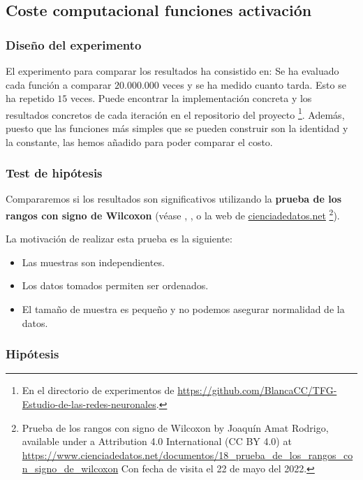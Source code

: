 \subsection{Coste computacional funciones activación }
\label{ch06:coste-computacional-funciones-activacion}

\subsubsection{Diseño del experimento}
El experimento para comparar los resultados ha consistido en: 
Se ha evaluado cada función a comparar $20.000.000$ veces y se ha medido cuanto tarda. 
Esto se ha repetido $15$ veces. Puede encontrar la implementación concreta y los resultados concretos de cada iteración en el repositorio del
proyecto \footnote{En el directorio de experimentos 
de \url{https://github.com/BlancaCC/TFG-Estudio-de-las-redes-neuronales}.}.
Además, puesto que las funciones más simples que se pueden construir son la identidad y la constante, las hemos añadido para poder comparar el costo. 

\subsubsection{Test de hipótesis}

Compararemos si los resultados son significativos utilizando la \textbf{prueba de los rangos con 
signo de Wilcoxon} (véase \cite{OpenIntroStatistics}, \cite{BiologicalStatistics}, o la web de \href{https://www.cienciadedatos.net}{cienciadedatos.net} \footnote{
 Prueba de los rangos con signo de Wilcoxon by Joaquín Amat Rodrigo, available under a Attribution 4.0 International (CC BY 4.0) at
  \url{https://www.cienciadedatos.net/documentos/18_prueba_de_los_rangos_con_signo_de_wilcoxon}
  Con fecha de visita el 22 de mayo del 2022.
  }).

  La motivación de realizar esta prueba es la siguiente: 
\begin{itemize}
    \item Las muestras son independientes.
    \item Los datos tomados permiten ser ordenados. 
    \item El tamaño de muestra es pequeño y no podemos asegurar normalidad de la datos. 
\end{itemize}

\subsubsection*{Hipótesis} 

